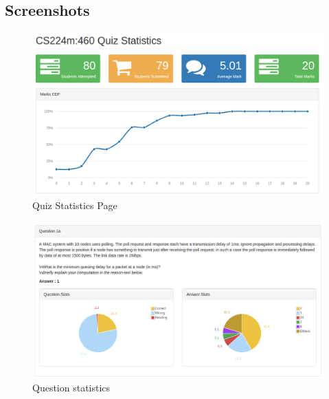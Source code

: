 \subsection{Screenshots}
    \begin{figure}[h!]
    \begin{center}
    \includegraphics[scale=.4]{diagrams/quiz_stat_1.png} 
    \vspace{1cm}
    \caption{Quiz Statistics Page}
    \end{center}
    \end{figure}
    
    \begin{figure}[h!]
    \begin{center}
    \includegraphics[scale=.4]{diagrams/quiz-stat-2.png} 
    \vspace{1cm}
    \caption{Question statistics}
    \end{center}
    \end{figure}